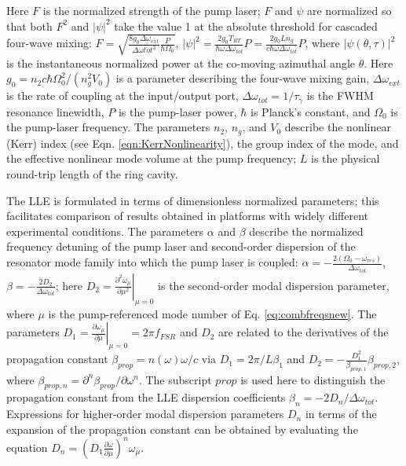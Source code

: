 Here $F$ is the normalized strength of the pump laser; $F$ and $\psi$ are normalized so that both $F^2$ and $|\psi|^2$ take the value 1 at the absolute threshold for cascaded four-wave mixing: $F=\sqrt{\frac{8 g_0\Delta\omega_{ext}}{\Delta\omega{tot}^3}\frac{P}{\hbar \Omega_0}}$, $|\psi|^2=\frac{2g_0T_{RT}}{\hbar\omega\Delta\omega_{tot}}P=\frac{2g_0Ln_g}{c\hbar\omega\Delta\omega_{tot}}P$, where $|\psi(\theta,\tau)|^2$ is the instantaneous normalized power at the co-moving azimuthal angle $\theta$. Here $g_0=n_2 c \hbar \Omega_0^2/(n_g^2 V_0)$ is a parameter describing the four-wave mixing gain, $\Delta\omega_{ext}$ is the rate of coupling at the input/output port, $\Delta\omega_{tot}=1/\tau_\gamma$ is the FWHM resonance linewidth, $P$ is the pump-laser power, $\hbar$ is Planck's constant, and $\Omega_0$ is the pump-laser frequency. The parameters $n_2$, $n_g$, and $V_0$ describe the nonlinear (Kerr) index (see Eqn. \ref{eqn:KerrNonlinearity}), the group index of the mode, and the effective nonlinear mode volume at the pump frequency; $L$ is the physical round-trip length of the ring cavity. 

The LLE is formulated in terms of dimensionless normalized parameters; this facilitates comparison of results obtained in platforms with widely different experimental conditions. The parameters $\alpha$ and $\beta$ describe the normalized frequency detuning of the pump laser and second-order dispersion of the resonator mode family into which the pump laser is coupled: $\alpha=-\frac{2(\Omega_0-\omega_{res})}{\Delta\omega_{tot}}$, $\beta=-\frac{2 D_2}{\Delta\omega_{tot}}$; here $D_2=\left.\frac{\partial^2\omega_\mu}{\partial \mu^2}\right|_{\mu=0}$ is the second-order modal dispersion parameter, where $\mu$ is the pump-referenced mode number of Eq. \ref{eq:combfreqsnew}. The parameters $D_1=\left.\frac{\partial\omega_\mu}{\partial\mu}\right|_{\mu=0}=2\pi f_{FSR}$ and $D_2$ are related to the derivatives of the propagation constant $\beta_{prop}=n(\omega)\omega/c$ via $D_1=2\pi/L\beta_1$ and $D_2=-\frac{D_1^2}{\beta_{prop,1}}\beta_{prop,2}$, where $\beta_{prop,n}=\partial^n\beta_{prop}/\partial\omega^n$. The subscript $prop$ is used here to distinguish the propagation constant from the LLE dispersion coefficients $\beta_n=-2D_n/\Delta\omega_{tot}$. Expressions for higher-order modal dispersion parameters $D_n$ in terms of the expansion of the propagation constant can be obtained by evaluating the equation $D_n=(D_1\frac{\partial \omega}{\partial \mu})^n \omega_\mu$.


%



